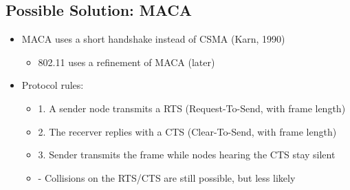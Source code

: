 \documentclass[12pt]{ctexart}   %
\begin{document}
	\subsection{Possible Solution: MACA}
	\begin{itemize}
		\item MACA uses a short handshake instead of CSMA (Karn, 1990)
		\begin{itemize}
			\item 802.11 uses a refinement of MACA (later)
		\end{itemize}
		
		\item Protocol rules:
		\begin{itemize}
			\item {\color{blue} 1.} A sender node transmits a RTS (Request-To-Send, with frame length)
			\item {\color{blue} 2.} The recerver replies with a CTS (Clear-To-Send, with frame length)
			\item {\color{blue} 3.} Sender transmits the frame while nodes hearing the CTS stay silent
			\item {\color{blue} -} Collisions on the RTS/CTS are still possible, but less likely
		\end{itemize}
	\end{itemize}
	
\end{document}
